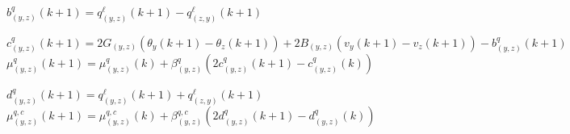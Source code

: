 \documentclass[10pt]{article}
\newtheorem{definitiox	n}{Definition}{\it}{}
\newcommand{\0}{\mathbf{0}}
\newcommand{\1}{\mathbf{1}}
\begin{document}
\begin{algorithm}[H]
\begin{algorithmic}[1]
\State 
$b^q_{(y,z)}(k+1) =  q^\ell_{(y,z)}(k+1) - q^\ell_{(z,y)}(k+1)$

\State
$c_{(y,z)}^q(k+1) = 2G_{(y,z)}(\theta_y(k+1)-\theta_z(k+1)) + 2B_{(y,z)}(v_y(k+1)-v_z(k+1)) - b^q_{(y,z)}(k+1)$
\State
$\mu_{(y,z)}^q(k+1) = \mu_{(y,z)}^q(k) + \beta_{(y,z)}^q (2c_{(y,z)}^q(k+1)-c_{(y,z)}^q(k)) $


\State
$d^q_{(y,z)}(k+1)  =  q^{\ell}_{(y,z)} (k+1) + q^{\ell}_{(z,y)} (k+1)$
\State
$\mu^{q,c}_{(y,z)}(k+1) = \mu^{q,c}_{(y,z)}(k) + \beta_{(y,z)}^{q,c} \left( 
	2  d^q_{(y,z)}(k+1) - d^q_{(y,z)}(k) \right)$

\EndFor

\EndDual

\end{algorithmic}
\end{algorithm}
\end{document}
